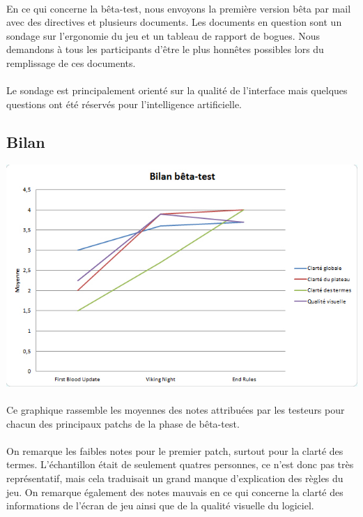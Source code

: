 \documentclass[11pt]{article} %
\begin{document}
\paragraph{}
En ce qui concerne la bêta-test, nous envoyons la première version bêta par mail avec des directives et plusieurs documents. Les documents en question sont un sondage sur l'ergonomie du jeu et un tableau de rapport de bogues. Nous demandons à tous les participants d'être le plus honnêtes possibles lors du remplissage de ces documents.
\paragraph{}
Le sondage est principalement orienté sur la qualité de l'interface mais quelques questions ont été réservés pour l'intelligence artificielle. 

\subsection{Bilan}

\begin{center}
\includegraphics[width=15cm]{resBeta.jpg}
\end{center}

\paragraph{}
Ce graphique rassemble les moyennes des notes attribuées par les testeurs pour chacun des principaux patchs de la phase de bêta-test. 
\paragraph{}
On remarque les faibles notes pour le premier patch, surtout pour la clarté des termes. L’échantillon était de seulement quatres personnes, ce n'est donc pas très représentatif, mais cela traduisait un grand manque d'explication des règles du jeu. On remarque également des notes mauvais en ce qui concerne la clarté des informations de l’écran de jeu ainsi que de la qualité visuelle du logiciel.
\end{document}
